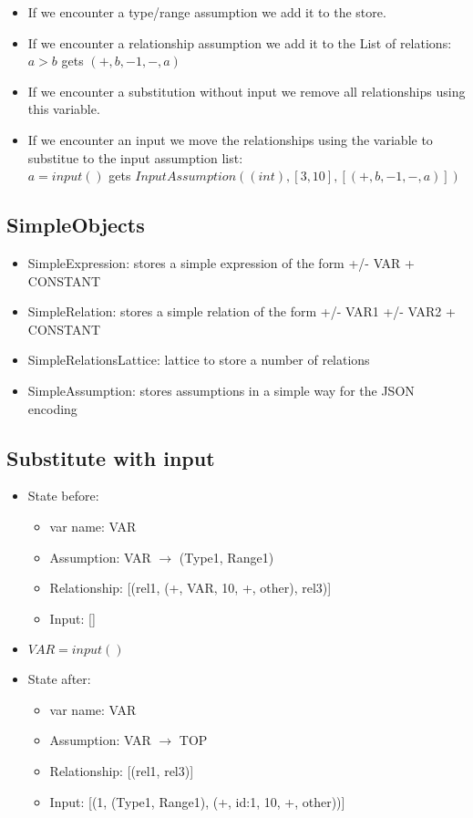 \documentclass[11pt]{article}
\begin{document}
\begin{itemize}
    \item If we encounter a type/range assumption we add it to the store.
    \item If we encounter a relationship assumption we add it to the List of relations:\\
    $a > b$ gets $(+, b, -1, -, a)$
    \item If we encounter a substitution without input we remove all relationships using this variable.
    \item If we encounter an input we move the relationships using the variable to substitue to the input assumption list:\\
    $a = input()$ gets $InputAssumption((int), [3, 10], [(+, b, -1, -, a)])$
\end{itemize}

\subsection{SimpleObjects}

\begin{itemize}
    \item SimpleExpression: stores a simple expression of the form +/- VAR + CONSTANT
    \item SimpleRelation: stores a simple relation of the form +/- VAR1 +/- VAR2 + CONSTANT
    \item SimpleRelationsLattice: lattice to store a number of relations
    \item SimpleAssumption: stores assumptions in a simple way for the JSON encoding
\end{itemize}

\subsection{Substitute with input}

\begin{itemize}
    \item State before:
    \begin{itemize}
        \item var name: VAR
        \item Assumption: VAR $\rightarrow$ (Type1, Range1)
        \item Relationship: [(rel1, (+, VAR, 10, +, other), rel3)]
        \item Input: []
    \end{itemize}
    \item $VAR = input()$
    \item State after:
    \begin{itemize}
        \item var name: VAR
        \item Assumption: VAR $\rightarrow$ TOP
        \item Relationship: [(rel1, rel3)]
        \item Input: [(1, (Type1, Range1), (+, id:1, 10, +, other))]
    \end{itemize}
\end{itemize}
\end{document}
